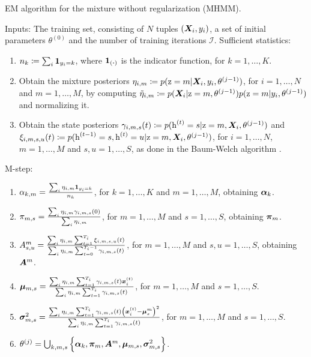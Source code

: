 \begin{algorithm}
	\caption{EM algorithm for the mixture without regularization (MHMM).}
	\label{alg:mhmm}
	\begin{algorithmic}
		\State Inputs: The training set, consisting of $N$ tuples $({\bm{X}}_i,y_i)$, a set of initial parameters $\theta^{(0)}$ and the number of training iterations $\mathcal{I}$.
		\State Sufficient statistics:
		\begin{enumerate}
			\item $n_k \coloneqq \sum_i \bm{1}_{y_i=k}$, where $\bm{1}_\mathrm{(\boldsymbol{\cdot})}$ is the indicator function, for $k=1,\dots,K$.
			\item Obtain the mixture posteriors $\eta_{i,m} \coloneqq p({\textnormal{z}}=m|{\bm{X}}_i, y_i,\theta^{(j-1)})$, for $i=1,\dots,N$ and $m=1,\dots,M$, by computing  $\tilde{\eta}_{i,m} \coloneqq p({\bm{X}}_i|{\textnormal{z}}=m, \theta^{(j-1)})p({\textnormal{z}}=m|y_i, \theta^{(j-1)})$ and normalizing it.
			\item Obtain the state posteriors $\gamma_{i,m,s}(t) \coloneqq p({\textnormal{h}}^{(t)}=s | {\textnormal{z}}=m, {\bm{X}}_i, \theta^{(j-1)})$ and $\xi_{i,m,s,u}(t) \coloneqq p({\textnormal{h}}^{(t-1)}=s, {\textnormal{h}}^{(t)}=u | {\textnormal{z}}=m, {\bm{X}}_i, \theta^{(j-1)})$, for $i=1,\dots,N$, $m=1,\dots,M$ and $s,u=1,\dots,S$, as done in the Baum-Welch algorithm \citet{Baum1972}.
		\end{enumerate}
		\State M-step:
		\begin{enumerate}
			\item ${\alpha}_{k,m} = \frac{\sum_i \eta_{i,m} \bm{1}_{y_i=k}}{n_k}$, for $k=1,\dots,K$ and $m=1,\dots,M$, obtaining ${\bm{\alpha}}_k$.
			\item ${\pi}_{m,s} = \frac{\sum_i \eta_{i,m} \gamma_{i,m,s}(0)}{\sum_i \eta_{i,m}}$, for $m=1,\dots,M$ and $s=1,\dots,S$, obtaining ${\bm{\pi}}_{m}$. 
			\item ${A}^m_{s,u} = \frac{\sum_i \eta_{i,m} \sum_{t=1}^{T_i} \xi_{i,m,s,u}(t)}{\sum_i \eta_{i,m} \sum_{t=0}^{T_i-1} \gamma_{i,m,s}(t)}$, for $m=1,\dots,M$ and $s,u=1,\dots,S$, obtaining ${\bm{A}}^m$.
			\item ${\bm{\mu}}_{m,s} = \frac{\sum_i \eta_{i,m} \sum_{t=1}^{T_i} \gamma_{i,m,s}(t) {\bm{x}}_i^{(t)}} {\sum_i \eta_{i,m} \sum_{t=1}^{T_i} \gamma_{i,m,s}(t)}$, for $m=1,\dots,M$ and $s=1,\dots,S$.
			\item ${\bm{\sigma}}^2_{m,s} = \frac{\sum_i \eta_{i,m} \sum_{t=1}^{T_i} \gamma_{i,m,s}(t) \left({\bm{x}}_i^{(t)} - \boldsymbol{\mu}^m_s\right)^2} {\sum_i \eta_{i,m} \sum_{t=1}^{T_i} \gamma_{i,m,s}(t)}$, for $m=1,\dots,M$ and $s=1,\dots,S$.
			\item $\theta^{(j)} = \bigcup_{k,m,s} \left\lbrace \boldsymbol{\alpha}_k, {\bm{\pi}}_{m}, {\bm{A}}^m, {\bm{\mu}}_{m,s}, {\bm{\sigma}}^2_{m,s} \right\rbrace$.
		\end{enumerate}
		\EndFor  
	\end{algorithmic}
\end{algorithm}

